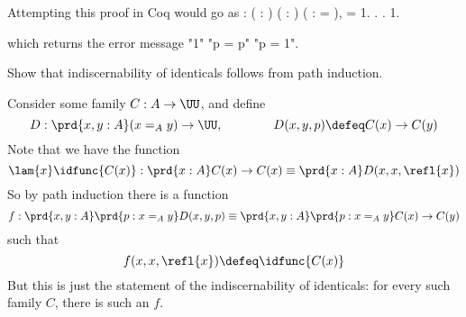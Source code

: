 Attempting this proof in Coq would go as
\coqdoceol
\coqdocemptyline
\coqdocnoindent
{}  : \coqdockw{\ensuremath{\forall}} ( : ) ( : ) ( :  = ),  = 1.\coqdoceol
\coqdocnoindent
{}. .\coqdoceol
\coqdocnoindent
{} 1.

\coqdocemptyline
\noindent
which returns the error message
\coqdoceol
\coqdocemptyline
\coqdocnoindent
{}  "1"   "p = p"        "p = 1".

\coqdocemptyline
\noindent


Show that indiscernability of identicals follows from path induction.

 \soln
    Consider some family $C : A \to \UU$, and define
    \[
    D : \prd{x, y : A} (x =_{A} y) \to \UU,
    \qquad\qquad
    D(x, y, p) \defeq C(x) \to C(y)
    \]
    Note that we have the function
    \[
    \lam{x}\idfunc{C(x)} : 
    \prd{x:A} C(x) \to C(x)
    \equiv
    \prd{x:A} D(x, x, \refl{x}) 
    \]
    So by path induction there is a function
    \[
    f : 
    \prd{x, y : A} \prd{p : x =_{A} y} D(x, y, p)
    \equiv
    \prd{x, y : A} \prd{p : x =_{A} y} C(x) \to C(y)
    \]
    such that
    \[
    f(x, x, \refl{x}) \defeq \idfunc{C(x)}
    \]
    But this is just the statement of the indiscernability of identicals: for every
    such family $C$, there is such an $f$.
 \begin{coqdoccode}
\end{coqdoccode}
